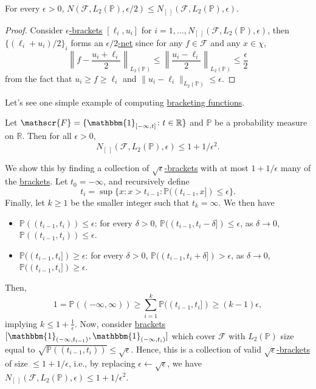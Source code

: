 \begin{lemma}
	For every \(\epsilon > 0\), \(N(\mathscr{F} , L_2(\mathbb{P} ), \epsilon / 2) \leq N_{[\ ]}(\mathscr{F} , L_2(\mathbb{P} ), \epsilon )\).
\end{lemma}
\begin{proof}
	Consider \hyperref[def:eps-bracket]{\(\epsilon \)-brackets} \([\ell _i, u_i]\) for \(i = 1, \dots , N_{[\ ]}(\mathscr{F} , L_2(\mathbb{P} ), \epsilon )\), then \(\{ (\ell _i + u_i) / 2 \}_i\) forms an \hyperref[def:eps-net]{\(\epsilon / 2\)-net} since for any \(f\in\mathscr{F} \) and any \(x\in \chi \),
	\[
		\left\lVert f - \frac{u_i + \ell _i}{2} \right\rVert _{L_2(\mathbb{P} )}
		\leq \left\lVert \frac{u_i - \ell _i}{2} \right\rVert _{L_2(\mathbb{P} )}
		\leq \frac{\epsilon}{2}
	\]
	from the fact that \(u_i \geq f \geq \ell _i\) and \(\lVert u_i - \ell _i \rVert _{L_2(\mathbb{P} )} \leq \epsilon \).
\end{proof}

Let's see one simple example of computing \hyperref[def:eps-bracket]{bracketing functions}.

\begin{eg}
	Let \(\mathscr{F} = \{ \mathbbm{1}_{[-\infty , t]} \colon t \in \mathbb{R}  \} \) and \(\mathbb{P} \) be a probability measure on \(\mathbb{R} \). Then for all \(\epsilon > 0\),
	\[
		N_{[\ ]}(\mathscr{F} , L_2(\mathbb{P} ) , \epsilon ) \leq 1 + 1 / \epsilon^2 .
	\]
\end{eg}
\begin{explanation}
	We show this by finding a collection of \hyperref[def:eps-bracket]{\(\sqrt{\epsilon }\)-brackets} with at most \(1 + 1 / \epsilon \) many of the \hyperref[def:eps-bracket]{brackets}. Let \(t_0 = -\infty \), and recursively define
	\[
		t_i = \sup \{x\colon x> t_{i-1} \colon \mathbb{P}((t_{i-1}, x]) \leq \epsilon \} .
	\]
	Finally, let \(k \geq 1\) be the smaller integer such that \(t_k = \infty \). We then have
	\begin{itemize}
		\item \(\mathbb{P} ((t_{i-1} , t_i))\leq \epsilon \): for every \(\delta > 0\), \(\mathbb{P} ((t_{i-1}, t_i - \delta ]) \leq \epsilon \), as \(\delta \to 0\), \(\mathbb{P} ((t_{i-1} , t_i)) \leq \epsilon \).
		\item \(\mathbb{P} ((t_{i-1}, t_i]) \geq \epsilon \): for every \(\delta > 0\), \(\mathbb{P} ((t_{i-1}, t_i + \delta ]) > \epsilon \), as \(\delta \to 0\), \(\mathbb{P} ((t_{i-1}, t_i]) \geq \epsilon \).
	\end{itemize}
	Then,
	\[
		1
		= \mathbb{P} ((-\infty , \infty ))
		\geq \sum_{i=1}^{k} \mathbb{P} ((t_{i-1}, t_i])
		\geq (k-1) \epsilon,
	\]
	implying \(k \leq 1 + \frac{1}{\epsilon }\). Now, consider \hyperref[def:eps-bracket]{brackets} \([\mathbbm{1}_{(-\infty , t_{i-1})} , \mathbbm{1}_{(-\infty , t_i)} ]\) which cover \(\mathscr{F} \) with \(L_2(\mathbb{P} )\) size equal to \(\sqrt{\mathbb{P} ((t_{i-1} , t_i))} \leq \sqrt{\epsilon} \). Hence, this is a collection of valid \hyperref[def:eps-bracket]{\(\sqrt{\epsilon }\)-brackets} of size \(\leq 1 + 1 / \epsilon \), i.e., by replacing \(\epsilon \gets \sqrt{\epsilon }\), we have \(N_{[\ ]}(\mathscr{F} , L_2(\mathbb{P} ), \epsilon )\leq 1 + 1 / \epsilon ^2\).
\end{explanation}

